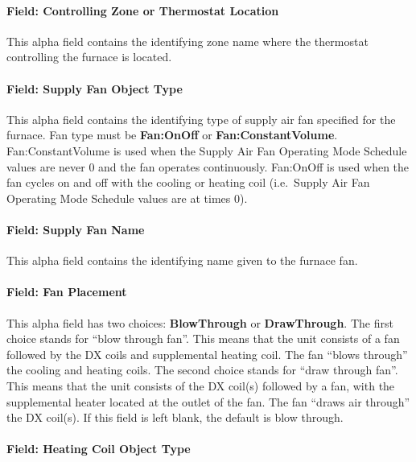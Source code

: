 \paragraph{Field: Controlling Zone or Thermostat Location}\label{field-controlling-zone-or-thermostat-location-1}

This alpha field contains the identifying zone name where the thermostat controlling the furnace is located.

\paragraph{Field: Supply Fan Object Type}\label{field-supply-fan-object-type-1}

This alpha field contains the identifying type of supply air fan specified for the furnace. Fan type must be \textbf{Fan:OnOff} or \textbf{Fan:ConstantVolume}. Fan:ConstantVolume is used when the Supply Air Fan Operating Mode Schedule values are never 0 and the fan operates continuously. Fan:OnOff is used when the fan cycles on and off with the cooling or heating coil (i.e.~Supply Air Fan Operating Mode Schedule values are at times 0).

\paragraph{Field: Supply Fan Name}\label{field-supply-fan-name-1}

This alpha field contains the identifying name given to the furnace fan.

\paragraph{Field: Fan Placement}\label{field-fan-placement-1}

This alpha field has two choices: \textbf{BlowThrough} or \textbf{DrawThrough}. The first choice stands for ``blow through fan''. This means that the unit consists of a fan followed by the DX coils and supplemental heating coil. The fan ``blows through'' the cooling and heating coils. The second choice stands for ``draw through fan''. This means that the unit consists of the DX coil(s) followed by a fan, with the supplemental heater located at the outlet of the fan. The fan ``draws air through'' the DX coil(s). If this field is left blank, the default is blow through.

\paragraph{Field: Heating Coil Object Type}\label{field-heating-coil-object-type-1-000}

